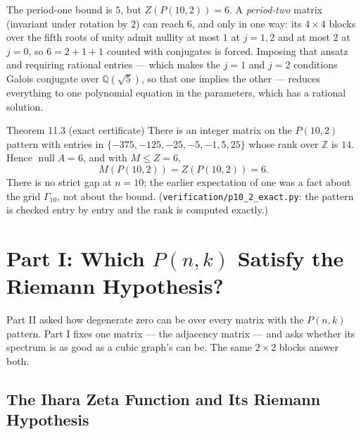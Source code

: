 \documentclass[11pt]{article}
\begin{document}
The period-one bound is $5$, but $Z(P(10,2))=6$. A \emph{period-two} matrix (invariant under rotation by $2$) can reach $6$, and only in one way: its $4\times4$ blocks over the fifth roots of unity admit nullity at most $1$ at $j=1,2$ and at most $2$ at $j=0$, so $6=2+1+1$ counted with conjugates is forced. Imposing that ansatz and requiring rational entries --- which makes the $j=1$ and $j=2$ conditions Galois conjugate over $\mathbb Q(\sqrt5)$, so that one implies the other --- reduces everything to one polynomial equation in the parameters, which has a rational solution.

\begin{thmbox}{Theorem 11.3 (exact certificate)}
There is an integer matrix on the $P(10,2)$ pattern with entries in $\{-375,-125,-25,-5,-1,5,25\}$ whose rank over $\mathbb Z$ is $14$. Hence $\operatorname{null}A=6$, and with $M\le Z=6$,
\begin{equation}
  M(P(10,2))=Z(P(10,2))=6 .
\end{equation}
There is no strict gap at $n=10$; the earlier expectation of one was a fact about the grid $\Gamma_{10}$, not about the bound. (\texttt{verification/p10\_2\_exact.py}: the pattern is checked entry by entry and the rank is computed exactly.)
\end{thmbox}

\newpage
\section{Part I: Which $P(n,k)$ Satisfy the Riemann Hypothesis?}

Part II asked how degenerate zero can be over every matrix with the $P(n,k)$ pattern. Part I fixes one matrix --- the adjacency matrix --- and asks whether its spectrum is as good as a cubic graph's can be. The same $2\times2$ blocks answer both.

\subsection{The Ihara Zeta Function and Its Riemann Hypothesis}
\end{document}
